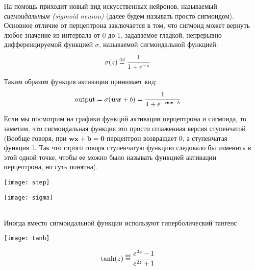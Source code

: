 На помощь приходит новый вид искусственных нейронов, называемый 
\textit{сигмоидальным (sigmoid neuron)} (далее будем называть просто сигмоидом). 
Основное отличие от перцептрона заключается в том, что
сигмоид может вернуть любое значение из интервала от 0 до 1, 
задаваемое гладкой, непрерывно дифференцируемой функцией $\sigma$, 
называемой сигмоидальной функцией:
\begin{equation*}
    \sigma(z) \defeq \cfrac{1}{1 + e^{-z}}
\end{equation*}

Таким образом функция активации принимает вид:
\begin{equation*}
    \text{output} = \sigma(\bm{wx} + b) = \cfrac{1}{1 + e^{-\bm{wx} - b}}
\end{equation*}

Если мы посмотрим на графики функций активации перцептрона и сигмоида, то 
заметим, что сигмоидальная функция это просто сглаженная версия ступенчатой 
(Вообще говоря, при $\bm{wx + b = 0}$ перцептрон возвращает 0, а ступенчатая 
функция 1. Так что строго говоря ступенчатую функцию следовало бы изменить в 
этой одной точке, чтобы ее можно было называть функцией активации перцептрона, но 
суть понятна).

\begin{minipage}{0.4\textwidth}
    \texttt{[image: step]}
    \label{fig:step}
\end{minipage}
\hspace{30pt}
\begin{minipage}{0.4\textwidth}
    \texttt{[image: sigma]}
    \label{fig:sigma}
\end{minipage}\\

Иногда вместо сигмоидальной функции используют гиперболический тангенс\\ 

\begin{minipage}{0.4\textwidth}
    \texttt{[image: tanh]}
    \label{fig:tanh}
\end{minipage}
\hspace{30pt}
\begin{minipage}{0.3\textwidth}
    \begin{equation*}
        \text{tanh}(z) \defeq \cfrac{e^{2z} - 1}{e^{2z} + 1}
    \end{equation*}
\end{minipage}\\

